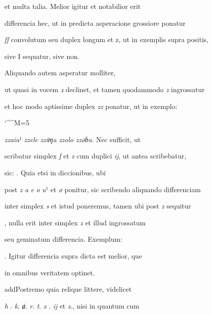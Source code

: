 et multa talia. Melior igitur et notabilior erit

differencia hec, ut in predicta asperacione grossiore ponatur

\textit{ſſ} convolutum seu duplex longum et z, ut in exemplis supra positis,

\splitlines

sive I sequatur, sive non.

\indentK Aliquando autem asperatur molliter,

\fulllines

ut quasi in vocem \textit{z} declinet, et tamen quodammodo \textit{z} ingrossatur

et hoc modo aptissime duplex \textit{zz} ponatur, ut in exemplo:

\catcode `\^^M=5
\obeylines

\textit{zzaia}¹ \textit{zzele} \textit{zziɱa} \textit{zzolo} \textit{zzøɓa}. Nec sufficit, ut


scribatur simplex \textit{ſ} et \textit{z} cum duplici \textit{ij}, ut antea scribebatur,

sic:  . Quia etsi in diccionibus, ubi

post \textit{z} \textit{a} \textit{e} \textit{o} \textit{u}¹ et \textit{ø} ponitur, sic scribendo aliquando differenciam

inter simplex \textit{s} et istud poneremus, tamen ubi post \textit{z} sequitur

, nulla erit inter simplex \textit{z} et illud ingrossatum

seu geminatum differencia. Exemplum:  

. Igitur differencia
supra dicta est melior, que

in omnibus veritatem optinet.

\indentP add{P}ostremo quia relique littere, videlicet

\textit{h} . \textit{k}. \textit{ⱥ}. \textit{r}. \textit{t}. \textit{x} . \textit{ij} et \textit{z}., nisi in quantum cum


